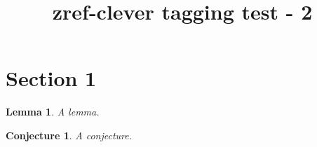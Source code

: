 \documentclass{article}
\title{zref-clever tagging test - 2}
\newtheorem{lem}{Lemma}[section]
\newtheorem{myconjecture}{Conjecture}[section]
\begin{document}
\section{Section 1}
\begin{lem}
A lemma.
\end{lem}
\begin{myconjecture}
A conjecture.
\end{myconjecture}
\end{document}
